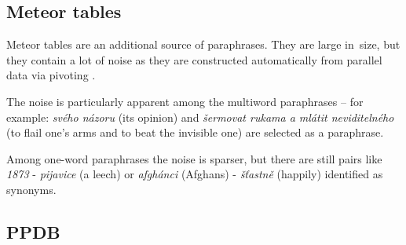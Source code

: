 \subsection{Meteor tables} %
\label{meteori}
Meteor tables \citep{meteor-tables} are an additional source of paraphrases. 
They are large in~size, but they contain a lot of noise as they are constructed automatically 
from parallel data via pivoting \citep{pivoting}. 

The noise is particularly apparent among the multiword paraphrases -- for 
example: \textit{svého názoru}  (its opinion) and \textit{šermovat rukama a 
mlátit neviditelného} (to flail one's arms and to beat the invisible one) are 
selected as a paraphrase. 

Among one-word paraphrases the noise is sparser, but there are still pairs like 
\textit{1873} - \textit{pijavice} (a leech) or \textit{afgh\'{a}nci} (Afghans) - 
\textit{š\v{t}astně} (happily) identified as synonyms. 


\subsection{PPDB} 